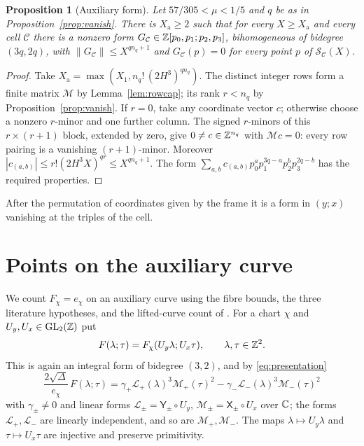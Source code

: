 \documentclass[11pt,reqno]{amsart}
\newtheorem{proposition}[theorem]{Proposition}
\theoremstyle{definition}
\theoremstyle{remark}
\numberwithin{equation}{section}
\begin{document}
\begin{proposition}[Auxiliary form]\label{prop:aux}
Let $57/305<\mu<1/5$ and $q$ be as in Proposition~\ref{prop:vanish}. There is
$X_{\mathrm a}\ge2$ such that for every $X\ge X_{\mathrm a}$ and every cell
$\mathcal C$ there is a nonzero form
$G_{\mathcal C}\in\mathbb Z[p_0,p_1;p_2,p_3]$, bihomogeneous of bidegree $(3q,2q)$,
with $\|G_{\mathcal C}\|\le X^{qn_q+1}$ and $G_{\mathcal C}(p)=0$ for every
point $p$ of $\mathcal S_{\mathcal C}(X)$.
\end{proposition}
\begin{proof}
Take $X_{\mathrm a}=\max(X_1,n_q!\,(2H^3)^{qn_q})$. The distinct
integer rows form a finite matrix $\mathcal M$ by
Lemma~\ref{lem:rowcap}; its rank $r<n_q$ by
Proposition~\ref{prop:vanish}. If $r=0$, take any coordinate vector
$c$; otherwise choose a nonzero $r$-minor and one further column.
The signed $r$-minors of this $r\times(r+1)$ block, extended by zero,
give $0\ne c\in\mathbb Z^{n_q}$ with $\mathcal Mc=0$: every row pairing is
a vanishing $(r+1)$-minor. Moreover
$|c_{(a,b)}|\le r!(2H^3X)^{qr}\le X^{qn_q+1}$.
The form $\sum_{a,b}c_{(a,b)}p_0^ap_1^{3q-a}p_2^bp_3^{2q-b}$
has the required properties.
\end{proof}
After the permutation of coordinates given by the frame it is a
form in $(y;x)$ vanishing at the triples of the cell.
\section{Points on the auxiliary curve}\label{sec:components}
We count $F_\chi=e_\chi$ on an auxiliary curve using the fibre bounds,
the three literature hypotheses, and the lifted-curve count of
\cite{powerful}. For a chart $\chi$ and $U_y,U_x\in\mathrm{GL}_2(\mathbb Z)$ put
\[
 F(\lambda;\tau)=F_\chi(U_y\lambda;U_x\tau),\qquad\lambda,\tau\in\mathbb Z^2 .
\]
This is again an integral form of bidegree $(3,2)$, and by
\eqref{eq:presentation}
\begin{equation}\label{eq:presentation2}
 \frac{2\sqrt\Delta}{e_\chi}\,F(\lambda;\tau)
 =\gamma_+\mathcal L_+(\lambda)^3\mathcal M_+(\tau)^2-\gamma_-\mathcal L_-(\lambda)^3\mathcal M_-(\tau)^2
\end{equation}
with $\gamma_\pm\ne0$ and linear forms $\mathcal L_\pm=\mathsf Y_\pm\circ U_y$,
$\mathcal M_\pm=\mathsf X_\pm\circ U_x$ over $\mathbb C$; the forms $\mathcal L_+,\mathcal L_-$ are linearly
independent, and so are $\mathcal M_+,\mathcal M_-$. The maps $\lambda\mapsto U_y\lambda$ and
$\tau\mapsto U_x\tau$ are injective and preserve primitivity.
\end{document}
